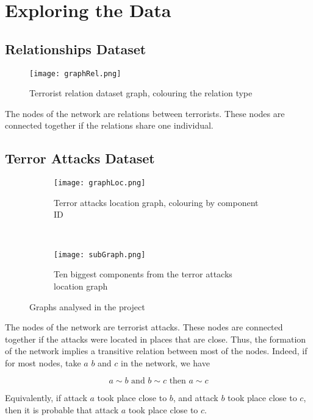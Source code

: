 \section{Exploring the Data}
\label{sec:Exploring the Data}

\subsection{Relationships Dataset}
\label{subsec:Relationships Dataset}

\begin{figure}[H]
\begin{center}

        \texttt{[image: graphRel.png]}
        \label{fig:graphLoc}
        \caption{Terrorist relation dataset graph, colouring the relation type}
        
\end{center}
\end{figure}

The nodes of the network are relations between terrorists. These nodes are connected together if the relations share one individual.

\subsection{Terror Attacks Dataset}
\label{subsec:Terror Attacks Dataset}

\begin{figure}[H]
\begin{center}
    \begin{subfigure}[b]{0.45\textwidth}
        \texttt{[image: graphLoc.png]}
        \caption{Terror attacks location graph, colouring by component ID}
        \label{fig:graphLoc}
    \end{subfigure}
    ~
    \begin{subfigure}[b]{0.45\textwidth}
        \texttt{[image: subGraph.png]}
        \caption{Ten biggest components from the terror attacks location graph}
        \label{fig:subGraph}
    \end{subfigure}
\caption{Graphs analysed in the project}
\label{fig:graphPlots}
\end{center}
\end{figure}

The nodes of the network are terrorist attacks. These nodes are connected together if the attacks were located in places that are close.
Thus, the formation of the network implies a transitive relation between most of the nodes. Indeed, if for most nodes, take $a$ $b$ and $c$ in the network, we have

\begin{equation}
	a \sim b \text{ and } b \sim c \text{ then } a \sim c 
\end{equation}

Equivalently, if attack $a$ took place close to $b$, and attack $b$ took place close to $c$, then it is probable that attack $a$ took place close to $c$.

